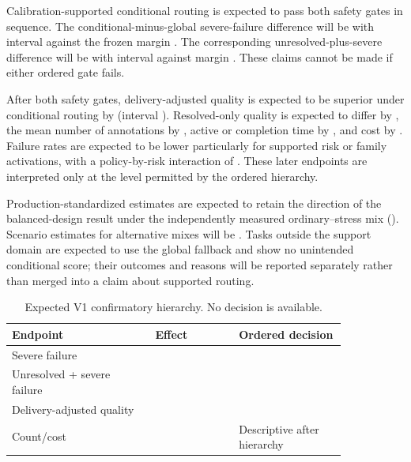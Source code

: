 \expectedresult{} Calibration-supported conditional routing is expected to pass both safety gates in sequence. The conditional-minus-global severe-failure difference will be \tbddata{} with interval \tbddata{} against the frozen margin \tbddata{}. The corresponding unresolved-plus-severe difference will be \tbddata{} with interval \tbddata{} against margin \tbddata{}. These claims cannot be made if either ordered gate fails.

\expectedresult{} After both safety gates, delivery-adjusted quality is expected to be superior under conditional routing by \tbddata{} (interval \tbddata{}). Resolved-only quality is expected to differ by \tbddata{}, the mean number of annotations by \tbddata{}, active or completion time by \tbddata{}, and cost by \tbddata{}. Failure rates are expected to be lower particularly for supported risk or family activations, with a policy-by-risk interaction of \tbddata{}. These later endpoints are interpreted only at the level permitted by the ordered hierarchy.

\expectedresult{} Production-standardized estimates are expected to retain the direction of the balanced-design result under the independently measured ordinary--stress mix (\tbddata{}). Scenario estimates for alternative mixes will be \tbddata{}. Tasks outside the support domain are expected to use the global fallback and show no unintended conditional score; their outcomes and reasons will be reported separately rather than merged into a claim about supported routing.

\begin{table}[t]
\centering
\caption{Expected V1 confirmatory hierarchy. No decision is available. \expectedresult{}}
\label{tab:expectedv1}
\begin{tabular}{p{0.36\linewidth}p{0.21\linewidth}p{0.27\linewidth}}
\toprule
Endpoint & Effect & Ordered decision \\
\midrule
Severe failure & \tbddata{} & \tbddata{} \\
Unresolved + severe failure & \tbddata{} & \tbddata{} \\
Delivery-adjusted quality & \tbddata{} & \tbddata{} \\
Count/cost & \tbddata{} & Descriptive after hierarchy \\
\bottomrule
\end{tabular}
\end{table}
